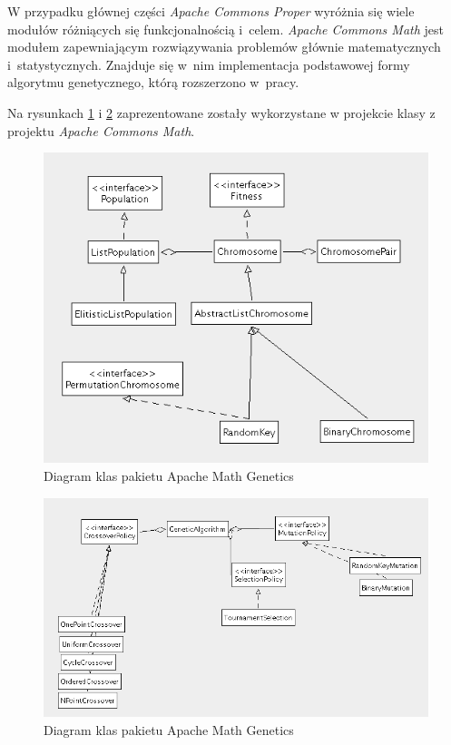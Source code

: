 \documentclass[twoside,12pt]{report}
\begin{document}
W przypadku głównej części\textit{ Apache Commons Proper} wyróżnia się wiele modułów różniących się funkcjonalnością i~celem. \textit{Apache Commons Math} jest modułem zapewniającym rozwiązywania problemów głównie matematycznych i~statystycznych. Znajduje się w~nim implementacja podstawowej formy algorytmu genetycznego, którą rozszerzono w~pracy.

Na rysunkach \ref{fig:class_math3_1} i \ref{fig:class_math3_2} zaprezentowane zostały wykorzystane w projekcie klasy z projektu \textit{Apache Commons Math}. 

\begin{figure}[htbp]
	\centering
	\includegraphics[width=\textwidth]{img/math3-1}
	\caption{Diagram klas pakietu Apache Math Genetics}
	\label{fig:class_math3_1}
\end{figure}

\begin{figure}[htbp]
	\centering
	\includegraphics[width=\textwidth]{img/math3-2}
	\caption{Diagram klas pakietu Apache Math Genetics}
	\label{fig:class_math3_2}
\end{figure}
\end{document}
